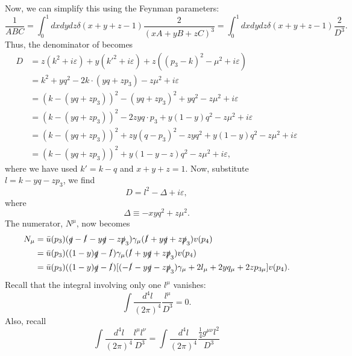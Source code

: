 \documentclass[11pt]{article}
\theoremstyle{definition}
\begin{document}
Now, we can simplify this using the Feynman parameters:
\begin{equation}
    \frac{1}{ABC} = \int^1_0dxdydz\delta(x+y+z-1)\frac{2}{(xA+yB+zC)^3} = \int^1_0dxdydz\delta(x+y+z-1)\frac{2}{D^3}.
\end{equation}
Thus, the denominator of becomes
\begin{equation}
\begin{aligned}
    D  &= z(k^2+i\varepsilon) + y(k'^2+i\varepsilon)+ z((p_3-k)^2-\mu^2+i\varepsilon) \\
    &= k^2 + yq^2 -2k\cdot (yq + zp_3)- z\mu^2 + i\varepsilon\\
    &= (k-(yq+zp_3))^2 - (yq+zp_3)^2 + yq^2- z\mu^2 + i\varepsilon\\
    &= (k-(yq+zp_3))^2 - 2zyq\cdot p_3 + y(1-y)q^2- z\mu^2 + i\varepsilon\\
    &= (k-(yq+zp_3))^2 + zy(q-p_3)^2 -zyq^2 + y(1-y)q^2- z\mu^2 + i\varepsilon\\
    &= (k-(yq+zp_3))^2  + y(1-y-z)q^2- z\mu^2 + i\varepsilon,
\end{aligned}
\end{equation}
where we have used $k' = k-q$ and $x+y+z=1$. Now, substitute $l = k-yq-zp_3$, we find
\begin{equation}
    D = l^2 - \Delta + i\varepsilon,
\end{equation}
where
\begin{equation}
    \Delta \equiv - xyq^2 + z\mu^2.
\end{equation}
The numerator, $N^\mu$, now becomes
\begin{equation}
    \begin{aligned}
        N_\mu &= \bar{u}(p_3)(\slashed{q} - \slashed{l}-y\slashed{q}-z\slashed{p}_3)\gamma_\mu(\slashed{l}+y\slashed{q}+z\slashed{p}_3)v(p_4)\\
        &= \bar{u}(p_3)((1-y)\slashed{q} - \slashed{l})\gamma_\mu(\slashed{l}+y\slashed{q}+z\slashed{p}_3)v(p_4)\\
        &= \bar{u}(p_3)((1-y)\slashed{q} - \slashed{l})[(-\slashed{l}-y\slashed{q}-z\slashed{p}_3)\gamma_\mu + 2l_\mu + 2yq_\mu + 2zp_{3\mu}]v(p_4).
    \end{aligned}
\end{equation}
Recall that the integral involving only one $l^\mu$ vanishes:
\begin{equation}
    \int \frac{d^4l}{(2\pi)^4}\frac{l^\mu}{D^3} = 0.
\end{equation}
Also, recall
\begin{equation}
    \int \frac{d^4l}{(2\pi)^4}\frac{l^\mu l^\nu}{D^3} = \int \frac{d^4l}{(2\pi)^4}\frac{\frac{1}{4}g^{\mu\nu}l^2}{D^3}
\end{equation}
\end{document}
